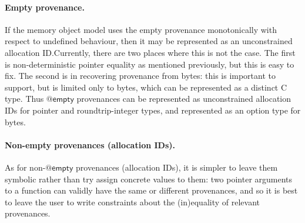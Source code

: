 \paragraph{Empty provenance.}%
If the memory object model uses the empty provenance monotonically with respect
to undefined behaviour, then it may be represented as an unconstrained
allocation ID.\@ Currently, there are two places where this is not the case.
The first is non-deterministic pointer equality as mentioned previously, but
this is easy to fix. The second is in recovering provenance from bytes: this
is important to support, but is limited only to bytes, which can be represented
as a distinct C type. Thus $@\mathsf{empty}$ provenances can be represented
as unconstrained allocation IDs for pointer and roundtrip-integer types,
and represented as an option type for bytes.


\paragraph{Non-empty provenances (allocation IDs).}%
As for non-$@\mathsf{empty}$ provenances (allocation IDs), it is simpler to
leave them symbolic rather than try assign concrete values to them: two pointer
arguments to a function can validly have the same or different provenances, and
so it is best to leave the user to write constraints about the (in)equality of %
relevant provenances.

